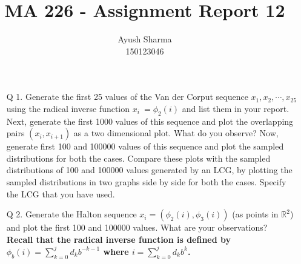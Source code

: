 \documentclass[11pt]{article}
\title{MA 226 - Assignment Report 12}
\author{Ayush Sharma\\150123046}
\begin{document}
\titlepage
\newpage
\begin{itemize}
\item[Q 1.] Generate the first 25 values of the Van der Corput sequence $x_1, x_2, \cdots, x_{25}$ using the radical inverse function $x_i \:= \phi_{2}(i)$ and list them in your report.
Next, generate the first 1000 values of this sequence and plot the overlapping pairs $(x_i, x_{i+1})$ as a two dimensional plot.
What do you observe?
Now, generate first 100 and 100000 values of this sequence and plot the sampled distributions for both the cases.
Compare these plots with the sampled distributions of 100 and 100000 values generated by an LCG, by plotting the sampled distributions in two graphs side by side for both the cases.
Specify the LCG that you have used.

\item[Q 2.] Generate the Halton sequence $x_i = (\phi_{2}(i), \phi_{3}(i))$ (as points in $\mathbb{R}^2$) and plot the first 100 and 100000 values.
What are your observations?\\
\textbf{Recall that the radical inverse function is defined by $\phi_{b}(i) = \sum_{k=0}^{j}d_{k}b^{-k-1}$ where $i = \sum_{k=0}^{j}d_{k}b^{k}$.}
\end{itemize}
\newpage
{}
\end{document}
